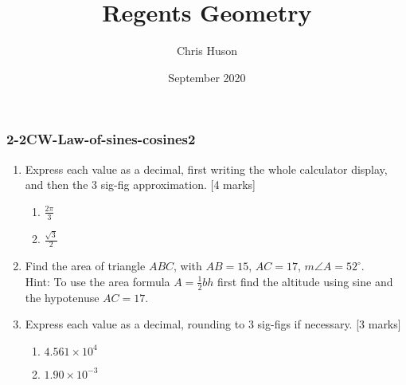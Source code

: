 \documentclass[12pt, twoside]{article}
\title{Regents Geometry}
\author{Chris Huson}
\date{September 2020}
\begin{document}
\subsubsection*{2-2CW-Law-of-sines-cosines2}
\begin{enumerate}
\item Express each value as a decimal, first writing the whole calculator display, and then the 3 sig-fig approximation. \hfill [4 marks]
  \begin{multicols}{2}
    \begin{enumerate}
    \item $\displaystyle \frac{2\pi}{3}$
    \item $\displaystyle \frac{\sqrt{3}}{2}$
    \end{enumerate}
  \end{multicols}

\item Find the area of triangle $ABC$, with $AB=15$, $AC=17$, $m\angle A = 52^\circ$. \\[0.5cm]
  Hint: To use the area formula $A = \frac{1}{2} bh$ first find the altitude using sine and the hypotenuse $AC=17$.
  \begin{flushleft}
    \end{flushleft}\item Express each value as a decimal, rounding to 3 sig-figs if necessary. \hfill [3 marks]
  \begin{multicols}{2}
    \begin{enumerate}
    \item $4.561 \times 10^4$
    \item $1.90 \times 10^{-3}$
    \end{enumerate}
  \end{multicols}


\end{enumerate}
\end{document}
